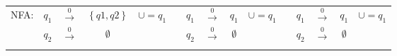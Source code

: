 \documentclass[
	final,
	a4paper,
	oneside,
	parskip=full,
	headings=standardclasses,
	headings=big,
	pointednumbers
]{scrartcl}
\begin{document}
\begin{tabular}{l|ccc|cl|ccc|cl|ccc|c}
            \multirow{2}{*}{NFA:}    & $q_1$                    & $\xrightarrow{0}$
                                     & $\left\{ q1,q2 \right\}$ & \multirow{2}{*}{$\cup = q_1$} &
            \multirow{2}{*}{}        & $q_1$                    & $\xrightarrow{0}$
                                     & $q_1$                    & \multirow{2}{*}{$\cup = q_1$} &
            \multirow{2}{*}{}        & $q_1$                    & $\xrightarrow{0}$
                                     & $q_1$                    & \multirow{2}{*}{$\cup = q_1$}
        \\
                                     & $q_2$    & $\xrightarrow{0}$ & $\emptyset$ & &
                                     & $q_2$    & $\xrightarrow{0}$ & $\emptyset$ & &
                                     & $q_2$    & $\xrightarrow{0}$ & $\emptyset$ &
        \\
            \cline{2-4} \cline{7-9} \cline{12-14}
            \multicolumn{1}{c}{} & & & \multicolumn{1}{c}{} & &
            \multicolumn{1}{c}{} & & & \multicolumn{1}{c}{} & &
            \multicolumn{1}{c}{} & & & \multicolumn{1}{c}{} &
        \\
            
    \end{tabular}
    
\end{document}
